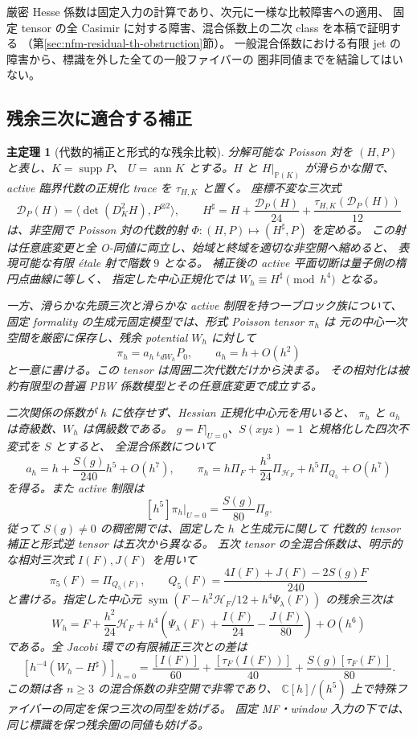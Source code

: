\documentclass[11pt,a4paper]{ltjsarticle}
\numberwithin{equation}{section}
\newtheorem{maintheorem}{主定理}
\newcommand{\C}{\mathbb C}
\newcommand{\PP}{\mathbb P}
\begin{document}
厳密 Hesse 係数は固定入力の計算であり、次元に一様な比較障害への適用、
固定 tensor の全 Casimir に対する障害、混合係数上の二次 class を本稿で証明する
（第\ref{sec:nfm-residual-th-obstruction}節）。
一般混合係数における有限 jet の障害から、標識を外した全ての一般ファイバーの
圏非同値までを結論してはいない。


\subsection{残余三次に適合する補正}

\begin{maintheorem}[代数的補正と形式的な残余比較]
分解可能な Poisson 対を $(H,P)$ と表し、$K=\operatorname{supp}P$、
$U=\operatorname{ann}K$ とする。$H$ と $H|_{\PP(K)}$ が滑らかな開で、
active 臨界代数の正規化 trace を $\tau_{H,K}$ と置く。
座標不変な三次式
\[
 \mathcal D_P(H)=\langle\det(D_K^2H),P^{\otimes2}\rangle,
 \qquad H^\sharp=H+\frac{\mathcal D_P(H)}{24}
                      +\frac{\tau_{H,K}(\mathcal D_P(H))}{12}
\]
は、非空開で Poisson 対の代数的射 $\Phi:(H,P)\mapsto(H^\sharp,P)$ を定める。
この射は任意底変更と全 O-同値に両立し、始域と終域を適切な非空開へ縮めると、
表現可能な有限 \emph{\'etale} 射で階数 $9$ となる。
補正後の active 平面切断は量子側の楕円点曲線に等しく、
指定した中心正規化では $W_h\equiv H^\sharp\pmod{h^4}$ となる。

一方、滑らかな先頭三次と滑らかな active 制限を持つ一ブロック族について、
固定 formality の生成元固定模型では、形式 Poisson tensor $\pi_h$ は
元の中心一次空間を厳密に保存し、残余 potential $W_h$ に対して
\[
 \pi_h=a_h\,\iota_{dW_h}P_0,\qquad a_h=h+O(h^2)
\]
と一意に書ける。この tensor は周囲二次代数だけから決まる。
その相対化は被約有限型の普遍 PBW 係数模型とその任意底変更で成立する。

二次関係の係数が $h$ に依存せず、Hessian 正規化中心元を用いると、
$\pi_h$ と $a_h$ は奇級数、$W_h$ は偶級数である。
$g=F|_{U=0}$、$S(xyz)=1$ と規格化した四次不変式を $S$ とすると、
全混合係数について
\[
a_h=h+\frac{S(g)}{240}h^5+O(h^7),\qquad
 \pi_h=h\Pi_F+\frac{h^3}{24}\Pi_{\mathscr H_F}
                 +h^5\Pi_{Q_5}+O(h^7)
\]
を得る。また active 制限は
\[
 [h^5]\pi_h|_{U=0}=\frac{S(g)}{80}\Pi_g.
\]
従って $S(g)\ne0$ の稠密開では、固定した $h$ と生成元に関して
代数的 tensor 補正と形式逆 tensor は五次から異なる。
五次 tensor の全混合係数は、明示的な相対三次式 $I(F),J(F)$ を用いて
\[
 \pi_5(F)=\Pi_{Q_5(F)},\qquad
 Q_5(F)=\frac{4I(F)+J(F)-2S(g)F}{240}
\]
と書ける。指定した中心元
$\operatorname{sym}(F-h^2\mathscr H_F/12+h^4\Psi_\lambda(F))$ の残余三次は
\[
 W_h=F+\frac{h^2}{24}\mathscr H_F
       +h^4\left(\Psi_\lambda(F)+\frac{I(F)}{24}-\frac{J(F)}{80}\right)+O(h^6)
\]
である。全 Jacobi 環での有限補正三次との差は
\[
 [h^{-4}(W_h-H^\sharp)]_{h=0}
 =\frac{[I(F)]}{60}+\frac{[\tau_F(I(F))]}{40}
                      +\frac{S(g)[\tau_F(F)]}{80}.
\]
この類は各 $n\ge3$ の混合係数の非空開で非零であり、
$\C[h]/(h^5)$ 上で特殊ファイバーの同定を保つ三次の同型を妨げる。
固定 MF・window 入力の下では、同じ標識を保つ残余圏の同値も妨げる。


\end{maintheorem}
\end{document}
